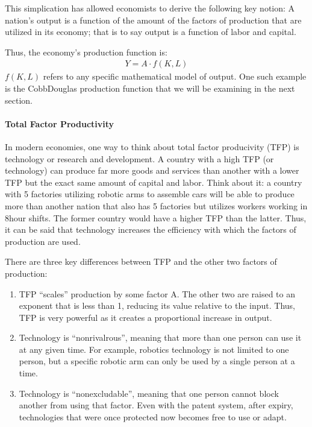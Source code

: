 \documentclass[letterpaper,10pt,english]{jupyterBook}
\begin{document}
\sphinxAtStartPar
This simplication has allowed economists to derive the following key notion:
A nation’s output is a function of the amount of the factors of production that are utilized in its economy; that is to say output is a function of labor and capital.

\sphinxAtStartPar
Thus, the economy’s production function is:
\begin{equation*}
\begin{split}Y = A \cdot f(K, L)\end{split}
\end{equation*}
\sphinxAtStartPar
\(f(K, L)\) refers to any specific mathematical model of output. One such example is the Cobb\sphinxhyphen{}Douglas production function that we will be examining in the next section.


\paragraph{Total Factor Productivity}
\label{\detokenize{content/04-production/production:total-factor-productivity}}
\sphinxAtStartPar
In modern economies, one way to think about total factor producivity (TFP) is technology or research and development. A country with a high TFP (or technology) can produce far more goods and services than another with a lower TFP but the exact same amount of capital and labor. Think about it: a country with 5 factories utilizing robotic arms to assemble cars will be able to produce more than another nation that also has 5 factories but utilizes workers working in 8\sphinxhyphen{}hour shifts. The former country would have a higher TFP than the latter. Thus, it can be said that technology increases the efficiency with which the factors of production are used.

\sphinxAtStartPar
There are three key differences between TFP and the other two factors of production:
\begin{enumerate}
%
\item {} 
\sphinxAtStartPar
TFP “scales” production by some factor A. The other two are raised to an exponent that is less than 1, reducing its value relative to the input. Thus, TFP is very powerful as it creates a proportional increase in output.

\item {} 
\sphinxAtStartPar
Technology is “non\sphinxhyphen{}rivalrous”, meaning that more than one person can use it at any given time. For example, robotics technology is not limited to one person, but a specific robotic arm can only be used by a single person at a time.

\item {} 
\sphinxAtStartPar
Technology is “non\sphinxhyphen{}excludable”, meaning that one person cannot block another from using that factor. Even with the patent system, after expiry, technologies that were once protected now becomes free to use or adapt.

\end{enumerate}
\end{document}
